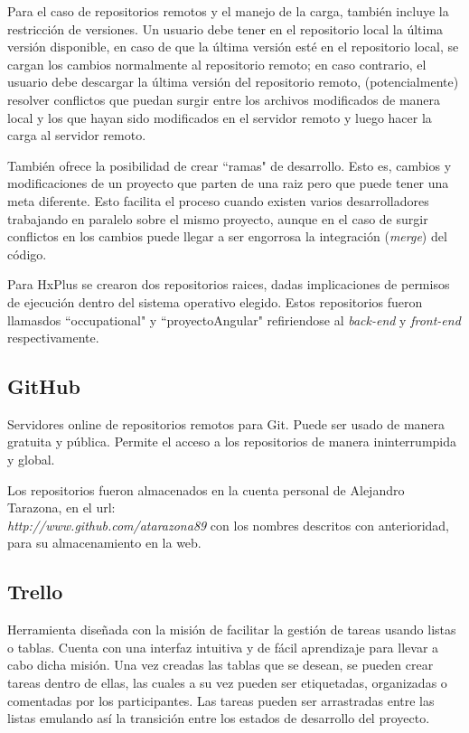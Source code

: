         Para el caso de repositorios remotos y el manejo de la carga, también incluye la restricción de versiones. Un usuario debe tener en el repositorio local la última versión disponible, en caso de que la última versión esté en el repositorio local, se cargan los cambios normalmente al repositorio remoto; en caso contrario, el usuario debe descargar la última versión del repositorio remoto, (potencialmente) resolver conflictos que puedan surgir entre los archivos modificados de manera local y los que hayan sido modificados en el servidor remoto y luego hacer la carga al servidor remoto.
        
        También ofrece la posibilidad de crear ``ramas" de desarrollo. Esto es, cambios y modificaciones de un proyecto que parten de una raiz pero que puede tener una meta diferente. Esto facilita el proceso cuando existen varios desarrolladores trabajando en paralelo sobre el mismo proyecto, aunque en el caso de surgir conflictos en los cambios puede llegar a ser engorrosa la integración (\textit{merge}) del código.
        
        Para HxPlus se crearon dos repositorios raices, dadas implicaciones de permisos de ejecución dentro del sistema operativo elegido. Estos repositorios fueron llamasdos ``occupational" y ``proyectoAngular" refiriendose al \textit{back-end} y \textit{front-end} respectivamente.
        
        \subsection{GitHub}
        \label{tecno-github}
        
        Servidores online de repositorios remotos para Git. Puede ser usado de manera gratuita y pública. Permite el acceso a los repositorios de manera ininterrumpida y global.
        
        Los repositorios fueron almacenados en la cuenta personal de Alejandro Tarazona, en el url:\\ \textit{http://www.github.com/atarazona89} con los nombres descritos con anterioridad, para su almacenamiento en la web.
        
        \subsection{Trello}
        \label{tecno-trello}
        
        Herramienta diseñada con la misión de facilitar la gestión de tareas usando listas o tablas. Cuenta con una interfaz intuitiva y de fácil aprendizaje para llevar a cabo dicha misión. Una vez creadas las tablas que se desean, se pueden crear tareas dentro de ellas, las cuales a su vez pueden ser etiquetadas, organizadas o comentadas por los participantes. Las tareas pueden ser arrastradas entre las listas emulando así la transición entre los estados de desarrollo del proyecto.
    
\pagebreak